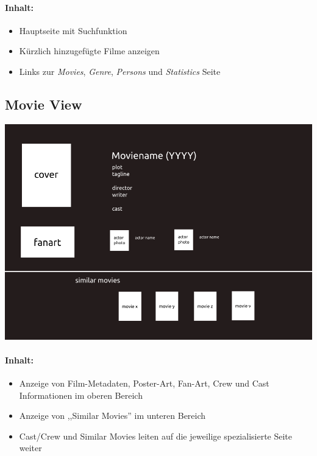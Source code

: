 \documentclass[11pt]{scrreprt}
\begin{document}
\paragraph{Inhalt:}
\begin{itemize}
\item Hauptseite mit Suchfunktion
\item Kürzlich hinzugefügte Filme anzeigen
\item Links zur \emph{Movies}, \emph{Genre}, \emph{Persons} und
    \emph{Statistics} Seite
\end{itemize}

\subsection{Movie View}
\includegraphics[width=\textwidth]{../pics/movieview}
\paragraph{Inhalt:}
\begin{itemize}
    \item Anzeige von Film-Metadaten, Poster-Art, Fan-Art, Crew und Cast
        Informationen im oberen Bereich
    \item Anzeige von ,,Similar Movies'' im unteren Bereich
    \item Cast/Crew und Similar Movies leiten auf die jeweilige spezialisierte
        Seite weiter
\end{itemize}
\end{document}
